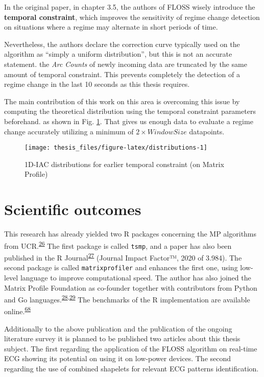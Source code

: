 \documentclass[12pt,twoside]{fmupthesis}
\begin{document}
In the original paper, in chapter 3.5, the authors of FLOSS wisely introduce the \textbf{temporal
constraint}, which improves the sensitivity of regime change detection on situations where
a regime may alternate in short periods of time.

Nevertheless, the authors declare the correction curve typically used on the algorithm as ``simply a
uniform distribution'', but this is not an accurate statement. the \emph{Arc Counts} of newly incoming
data are truncated by the same amount of temporal constraint. This prevents completely the detection
of a regime change in the last 10 seconds as this thesis requires.

The main contribution of this work on this area is overcoming this issue by computing the
theoretical distribution using the temporal constraint parameters beforehand. as shown in Fig.
\ref{fig:distributions}. That gives us enough data to evaluate a regime change accurately utilizing
a minimum of \(2 \times WindowSize\) datapoints.
\begin{figure}

{\centering \texttt{[image: thesis\_files/figure-latex/distributions-1]} 

}

\caption{1D-IAC distributions for earlier temporal constraint (on Matrix Profile)}\label{fig:distributions}
\end{figure}
\hypertarget{scientific-outcomes}{%
\chapter{Scientific outcomes}\label{scientific-outcomes}}

This research has already yielded two R packages concerning the MP algorithms from UCR.\textsuperscript{\protect\hyperlink{ref-mpucr}{26}} The
first package is called \texttt{tsmp}, and a paper has also been published in the R Journal\textsuperscript{\protect\hyperlink{ref-RJ-2020-021}{27}}
(Journal Impact Factor™, 2020 of 3.984). The second package is called \texttt{matrixprofiler} and enhances
the first one, using low-level language to improve computational speed. The author has also joined
the Matrix Profile Foundation as co-founder together with contributors from Python and Go languages.\textsuperscript{\protect\hyperlink{ref-mpf2020}{28},\protect\hyperlink{ref-VanBenschoten2020}{29}} The benchmarks of the R implementation are available online.\textsuperscript{\protect\hyperlink{ref-Bischoff2021a}{68}}

Additionally to the above publication and the publication of the ongoing literature survey it is planned
to be published two articles about this thesis subject. The first regarding the application of the
FLOSS algorithm on real-time ECG showing its potential on using it on low-power devices. The second
regarding the use of combined shapelets for relevant ECG patterns identification.
\end{document}
